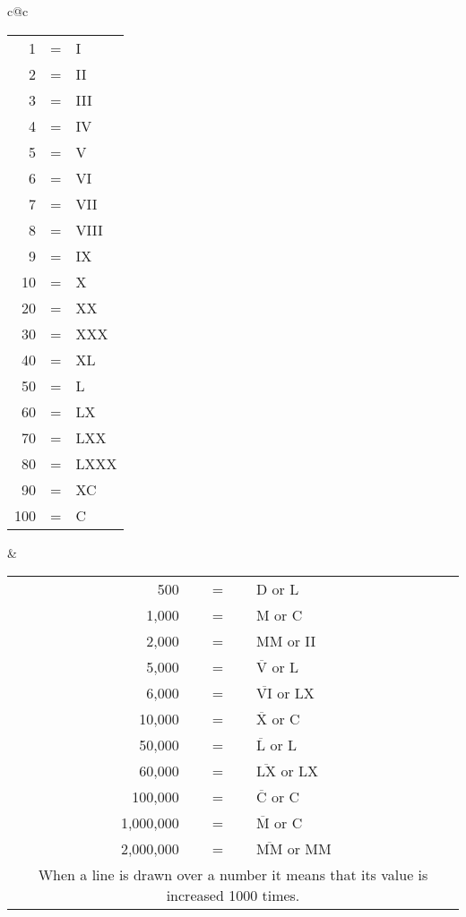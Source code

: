 \topline
\begin{center}
\begin{tabular}{c@{\qquad\qquad\qquad}c}
\small
  \begin{tabular}[t]{r@{\;}c@{\;}l}
      1 & = & I\\
      2 & = & II\\
      3 & = & III\\
      4 & = & IV\\
      5 & = & V\\
      6 & = & VI\\
      7 & = & VII\\
      8 & = & VIII\\
      9 & = & IX\\
     10 & = & X\\
     20 & = & XX\\
     30 & = & XXX\\
     40 & = & XL\\
     50 & = & L\\
     60 & = & LX\\
     70 & = & LXX\\
     80 & = & LXXX\\
     90 & = & XC\\
    100 & = & C
  \end{tabular}&
  \begin{tabular}[t]{r@{\;}c@{\;}l}
          500 & = & D or L\nbrotC\\
        1,000 & = & M or C\nbrotC\\
        2,000 & = & MM or II\nbrotC\nbrotC\nbrotC\\
        5,000 & = & $\overline{\text{V}}$ or L\nbrotC\nbrotC\\
        6,000 & = & $\overline{\text{VI}}$ or LX\nbrotC\nbrotC\\ %
       10,000 & = & $\overline{\text{X}}$ or C\nbrotC\nbrotC\\
       50,000 & = & $\overline{\text{L}}$ or L\nbrotC\nbrotC\nbrotC\\
       60,000 & = & $\overline{\text{LX}}$ or LX\nbrotC\nbrotC\nbrotC\\ %
      100,000 & = & $\overline{\text{C}}$ or C\nbrotC\nbrotC\nbrotC\\
    1,000,000 & = & $\overline{\text{M}}$ or C\nbrotC\nbrotC\nbrotC\nbrotC\\
    2,000,000 & = & $\overline{\text{MM}}$ or MM\nbrotC\nbrotC\nbrotC\\[1ex]
    \multicolumn{3}{c}{\parbox{14em}{When a line is drawn over a number it means that its value is increased 1000 times.}}
  \end{tabular}
\end{tabular}
\end{center}
\label{tbl:romannumerals}
\bottomline
\medskip

